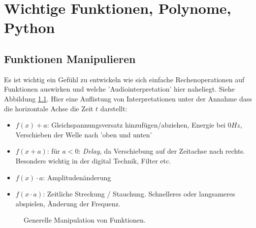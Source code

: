 \chapter{Wichtige Funktionen, Polynome, Python}




\section{Funktionen Manipulieren}
Es ist wichtig ein Gefühl zu entwickeln wie sich einfache Rechenoperationen auf Funktionen auswirken und welche 'Audiointerpretation' hier naheliegt. Siehe Abbildung \ref{fig:functManipul}.
Hier eine Auflistung von Interpretationen unter der Annahme dass die horizontale Achse die Zeit $t$ darstellt:
\begin{itemize}
	\item $f(x) + a$: Gleichspannungsversatz hinzufügen/abziehen, Energie bei $0 Hz$, Verschieben der Welle nach 'oben und unten'
	\item $f(x+a)$: für $a<0$: \emph{Delay}, da Verschiebung auf der Zeitachse nach rechts. Besonders wichtig in der digital Technik, Filter etc. 
	\item $f(x) \cdot a$: Amplitudenänderung
	\item $f(x \cdot a)$: Zeitliche Streckung / Stauchung. Schnelleres oder langsameres abspielen, Änderung der Frequenz.

\end{itemize}

\begin{figure}[H]
	\centering
	
	\caption{Generelle Manipulation von Funktionen.}
	\label{fig:functManipul}
\end{figure}




